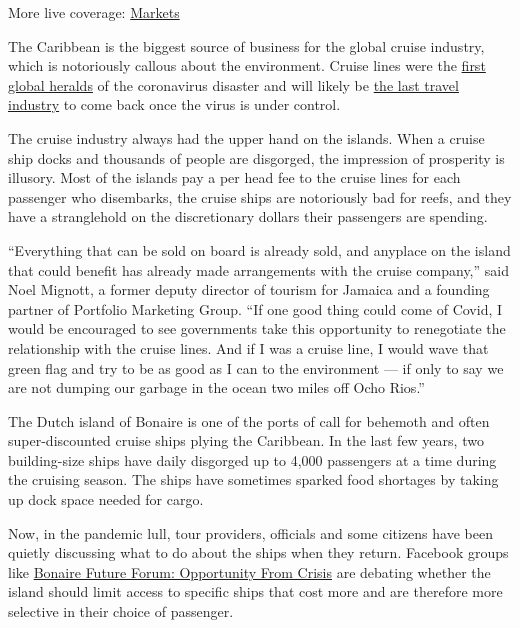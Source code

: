 More live coverage:
\href{https://www.nytimes3xbfgragh.onion/live/2020/08/04/business/stock-market-today-coronavirus?action=click\&pgtype=Article\&state=default\&region=MAIN_CONTENT_1\&context=storylines_live_updates}{Markets}

The Caribbean is the biggest source of business for the global cruise
industry, which is notoriously callous about the environment. Cruise
lines were the
\href{https://www.nytimes3xbfgragh.onion/2020/03/19/travel/coronavirus-cruise-costa-luminosa.html}{first
global heralds} of the coronavirus disaster and will likely be
\href{https://www.nytimes3xbfgragh.onion/2020/06/26/travel/coronavirus-cruises-reopening.html}{the
last travel industry} to come back once the virus is under control.

The cruise industry always had the upper hand on the islands. When a
cruise ship docks and thousands of people are disgorged, the impression
of prosperity is illusory. Most of the islands pay a per head fee to the
cruise lines for each passenger who disembarks, the cruise ships are
notoriously bad for reefs, and they have a stranglehold on the
discretionary dollars their passengers are spending.

``Everything that can be sold on board is already sold, and anyplace on
the island that could benefit has already made arrangements with the
cruise company,'' said Noel Mignott, a former deputy director of tourism
for Jamaica and a founding partner of Portfolio Marketing Group. ``If
one good thing could come of Covid, I would be encouraged to see
governments take this opportunity to renegotiate the relationship with
the cruise lines. And if I was a cruise line, I would wave that green
flag and try to be as good as I can to the environment --- if only to
say we are not dumping our garbage in the ocean two miles off Ocho
Rios.''

The Dutch island of Bonaire is one of the ports of call for behemoth and
often super-discounted cruise ships plying the Caribbean. In the last
few years, two building-size ships have daily disgorged up to 4,000
passengers at a time during the cruising season. The ships have
sometimes sparked food shortages by taking up dock space needed for
cargo.

Now, in the pandemic lull, tour providers, officials and some citizens
have been quietly discussing what to do about the ships when they
return. Facebook groups like
\href{https://www.facebookcorewwwi.onion/groups/BonaireFutureForum/}{Bonaire
Future Forum: Opportunity From Crisis} are debating whether the island
should limit access to specific ships that cost more and are therefore
more selective in their choice of passenger.

